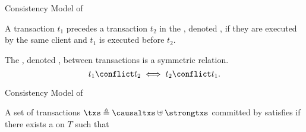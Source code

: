 \begin{frame}{Consistency Model of \unistore}
  \begin{definition}
    A transaction $t_{1}$ precedes a transaction $t_{2}$
    in the , denoted ,
    if they are executed by the same client and $t_{1}$ is executed before $t_{2}$.
  \end{definition}

  \vspace{0.60cm}
  \begin{definition}
    The , denoted \red{$\conflict$},
    between transactions is a symmetric relation.
    \[
      t_{1} \conflict t_{2} \iff t_{2} \conflict t_{1}.
    \]
  \end{definition}
\end{frame}

\begin{frame}{Consistency Model of \unistore}
  \begin{definition}[\por]
    A set of transactions $\txs \triangleq \causaltxs \uplus \strongtxs$
    committed by \unistore{} satisfies \blue{\por{}}
    if there exists a  on $T$ such that

    \vspace{0.30cm}
    \begin{description}[\ev:]
      \setlength{\itemsep}{8pt}
      \item[\causalityaxiom:]
      \item[\conflictaxiom:]
      \item[\ev:]
      \item[\retval:]
    \end{description}
  \end{definition}
\end{frame}

